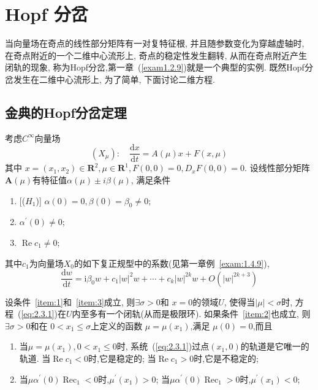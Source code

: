 \section{Hopf 分岔}
\label{sec:2.3}

当向量场在奇点的线性部分矩阵有一对复特征根,
并且随参数变化为穿越虚轴时,
在奇点附近的一个二维中心流形上,
奇点的稳定性发生翻转,
从而在奇点附近产生闭轨的现象,
称为Hopf分岔,第一章~(\ref{exam1.2.9})就是一个典型的实例.
既然Hopf分岔发生在二维中心流形上,
为了简单,
下面讨论二维方程.

\subsection{金典的Hopf分岔定理}
\label{sec:2.3.1}
考虑$C^{\infty}$向量场
\begin{equation}
  \label{eq:2.3.1}
\left(X_{\mu}\right) : \quad \frac{\mathrm{d} x}{\mathrm{d} t}=A(\mu) x+F(x, \mu)
\end{equation}
其中
$x=\left(x_{1}, x_{2}\right) \in \mathbf{R}^{2}, \mu \in \mathbf{R}^{1}, F(0,0)=0, D_{x} F(0,0)=0$.
设线性部分矩阵$\mathbf{A}(\mu)$有特征值$\alpha(\mu) \pm i \beta(\mu)$,
满足条件
\begin{enumerate}
\item\label{item:1}[($H_{1}$)]
 $ \alpha(0)=0, \beta(0)=\beta_{0} \neq 0 $;
\item\label{item:2}
  $\alpha^{\prime}(0) \neq 0 $;
\item\label{item:3}
  $\operatorname{Re} c_{1} \neq 0$;
\end{enumerate}

其中$c_1$为向量场$X_0$的如下复正规型中的系数(见第一章例~\ref{exam:1.4.9}),
\begin{equation}
  \label{eq:2.3.2}
\frac{\mathrm{d} w}{\mathrm{d} t}=\mathrm{i} \beta_{0} w+c_{1}|w|^{2} w+\cdots+c_{k}|w|^{2 k} w+O\left(|w|^{2 k+3}\right)
\end{equation}

\begin{theorem}[Hopf分岔定理]
  \label{thm:2.3.1}
  设条件~\ref{item:1}和~\ref{item:3}成立,
  则$\exists \sigma >0$和 $x=0$的领域$U$,
  使得当$|\mu|<\sigma$时,
  方程~(\ref{eq:2.3.1})在$U$内至多有一个闭轨(从而是极限环).
  如果条件~\ref{item:2}也成立,
  则$\exists \sigma>0$和在 $0< x_1 \leq \sigma$上定义的函数
  $\mu=\mu\left(x_{1}\right)$,满足
  $\mu(0)=0$,而且
  
\begin{enumerate}
\item\label{item:4}
  当$\mu=\mu\left(x_{1}\right), 0<x_{1} \leqslant 0$时,
  系统~(\ref{eq:2.3.1})过点$(x_1,0)$的轨道是它唯一的轨道.
  当$\operatorname{Re} c_{1}<0$时,它是稳定的;
  当$\operatorname{Re} c_{1}>0$时,它是不稳定的;
\item\label{item:5}
  当$\mu\alpha^{\prime}(0) \operatorname{Rec}_{1}<0$时,$\mu^{\prime}\left(x_{1}\right)>0$;
    当$\mu\alpha^{\prime}(0) \operatorname{Rec}_{1}>0$时,$\mu^{\prime}\left(x_{1}\right)<0$;
  \end{enumerate}
\end{theorem}

